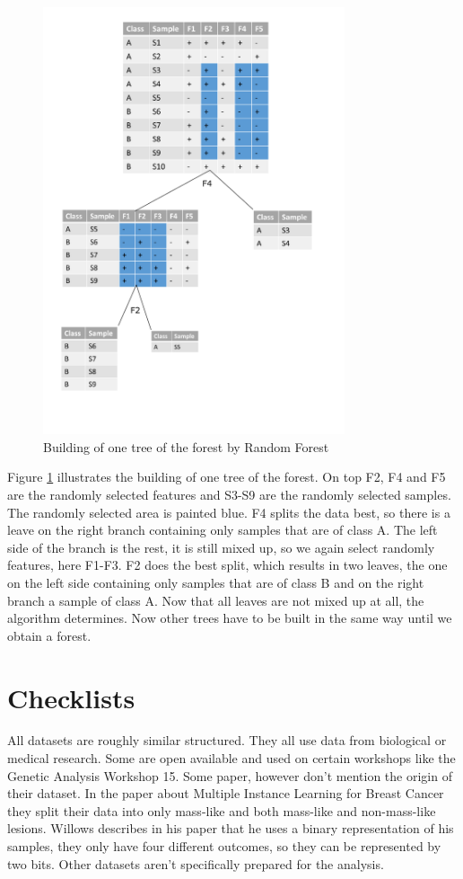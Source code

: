 \documentclass{sig-alternate-05-2015}
\begin{document}
\begin{figure}
\centering
\includegraphics[width=3.5in]{rf}
\caption{Building of one tree of the forest by Random Forest}
\label{fig:rf}
\end{figure}

Figure \ref{fig:rf} illustrates the building of one tree of the forest. On top F2, F4 and F5 are the randomly selected features and S3-S9 are the randomly selected samples. The randomly selected area is painted blue. F4 splits the data best, so there is a leave on the right branch containing only samples that are of class A. The left side of the branch is the rest, it is still mixed up, so we again select randomly features, here F1-F3. F2 does the best split, which results in two leaves, the one on the left side containing only samples that are of class B and on the right branch a sample of class A. Now that all leaves are not mixed up at all, the algorithm determines. Now other trees have to be built in the same way until we obtain a forest.

\section{Checklists}
All datasets are roughly similar structured. They all use data from biological or medical research. Some are open available and used on certain workshops like the Genetic Analysis Workshop 15. Some paper, however don't mention the origin of their dataset. In the paper about Multiple Instance Learning for Breast Cancer they split their data into only mass-like and both mass-like and non-mass-like lesions. Willows describes in his paper that he uses a binary representation of his samples, they only have four different outcomes, so they can be represented by two bits. Other datasets aren't specifically prepared for the analysis.
\end{document}
